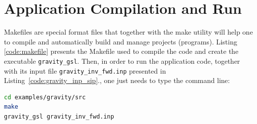 \section{Application Compilation and Run}\label{sec:application_compilation}


Makefiles are special format files that together with the make utility will help one to compile and automatically build and manage projects (programs).
Listing \ref{code:makefile} presents the Makefile used to compile the code and create the executable \verb+gravity_gsl+.
Then, in order to run the application code, together with its input file \verb+gravity_inv_fwd.inp+ presented in Listing~\ref{code:gravity_inp_sip}., one just needs to type the command line:

\begin{lstlisting}[caption={}, label={},language={bash}]
cd examples/gravity/src
make
gravity_gsl gravity_inv_fwd.inp
\end{lstlisting}


 
